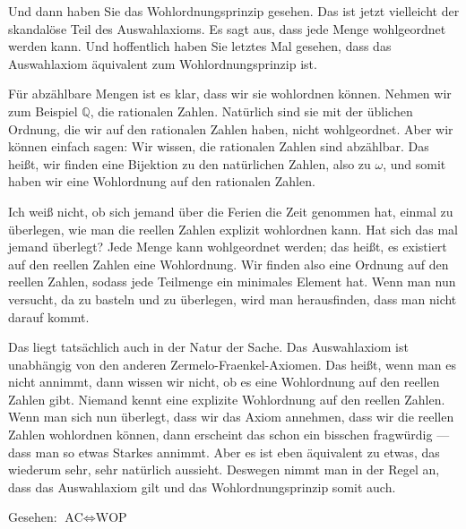 \begin{spoken-clean}[00:19:20 - 00:21:00]
Und dann haben Sie das Wohlordnungsprinzip gesehen. Das ist jetzt vielleicht der skandalöse Teil des Auswahlaxioms. Es sagt aus, dass jede Menge wohlgeordnet werden kann. Und hoffentlich haben Sie letztes Mal gesehen, dass das Auswahlaxiom äquivalent zum Wohlordnungsprinzip ist.

Für abzählbare Mengen ist es klar, dass wir sie wohlordnen können. Nehmen wir zum Beispiel $\mathbb{Q}$, die rationalen Zahlen. Natürlich sind sie mit der üblichen Ordnung, die wir auf den rationalen Zahlen haben, nicht wohlgeordnet. Aber wir können einfach sagen: Wir wissen, die rationalen Zahlen sind abzählbar. Das heißt, wir finden eine Bijektion zu den natürlichen Zahlen, also zu $\omega$, und somit haben wir eine Wohlordnung auf den rationalen Zahlen.

Ich weiß nicht, ob sich jemand über die Ferien die Zeit genommen hat, einmal zu überlegen, wie man die reellen Zahlen explizit wohlordnen kann. Hat sich das mal jemand überlegt? Jede Menge kann wohlgeordnet werden; das heißt, es existiert auf den reellen Zahlen eine Wohlordnung. Wir finden also eine Ordnung auf den reellen Zahlen, sodass jede Teilmenge ein minimales Element hat. Wenn man nun versucht, da zu basteln und zu überlegen, wird man herausfinden, dass man nicht darauf kommt.

Das liegt tatsächlich auch in der Natur der Sache. Das Auswahlaxiom ist unabhängig von den anderen Zermelo-Fraenkel-Axiomen. Das heißt, wenn man es nicht annimmt, dann wissen wir nicht, ob es eine Wohlordnung auf den reellen Zahlen gibt. Niemand kennt eine explizite Wohlordnung auf den reellen Zahlen. Wenn man sich nun überlegt, dass wir das Axiom annehmen, dass wir die reellen Zahlen wohlordnen können, dann erscheint das schon ein bisschen fragwürdig --- dass man so etwas Starkes annimmt. Aber es ist eben äquivalent zu etwas, das wiederum sehr, sehr natürlich aussieht. Deswegen nimmt man in der Regel an, dass das Auswahlaxiom gilt und das Wohlordnungsprinzip somit auch.
\end{spoken-clean}

\begin{math-stroke}

Gesehen: $\text{AC} \iff \text{WOP}$
\end{math-stroke}

